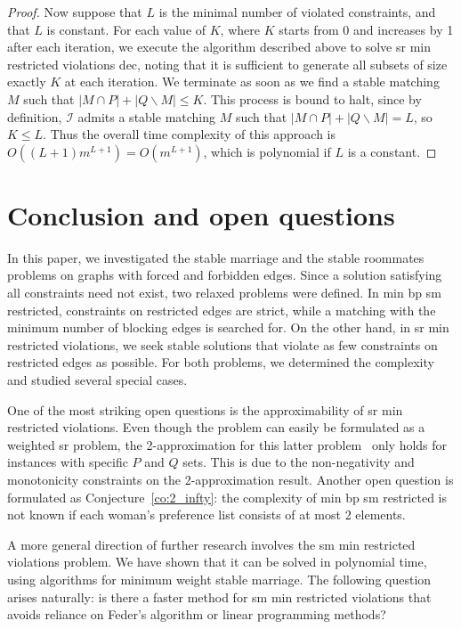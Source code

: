 \documentclass[preprint,12pt]{elsarticle}
\begin{document}
\begin{proof}
Now suppose that $L$ is the minimal number of violated constraints, and that $L$ is constant. For each value of $K$, where $K$ starts from 0 and increases by 1 after each iteration, we execute the algorithm described above to solve {\sc sr min restricted violations dec}, noting that it is sufficient to generate all subsets of size exactly $K$ at each iteration.  We terminate as soon as we find a stable matching $M$ such that 
 $|M\cap P|+|Q\backslash M|\leq K$.  This process is bound to halt, since by definition, $\mathcal I$ admits a stable matching $M$ such that $|M\cap P|+|Q\backslash M|=L$, so $K\leq L$. Thus the overall time complexity of this approach is $O((L+1)m^{L+1})=O(m^{L+1})$, which is polynomial if $L$ is a constant.
\end{proof}

\section{Conclusion and open questions}
\label{sec:conc}
    In this paper, we investigated the stable marriage and the stable roommates problems on graphs with forced and forbidden edges. Since a solution satisfying all constraints need not exist, two relaxed problems were defined. In {\sc min bp sm restricted}, constraints on restricted edges are strict, while a matching with the  minimum number of blocking edges is searched for. On the other hand, in {\sc sr min restricted violations}, we seek stable solutions that violate as few constraints on restricted edges as possible. For both problems, we determined the complexity and studied several special cases.
    
One of the most striking open questions is the approximability of {\sc sr min restricted violations}. Even though the problem can easily be formulated as a weighted {\sc sr} problem, the 2-approximation for this latter problem~\cite{TS97,TS98} only holds for instances with specific $P$ and $Q$ sets. This is due to the non-negativity and monotonicity constraints on the 2-approximation result. Another open question is formulated as Conjecture~\ref{co:2_infty}: the complexity of {\sc min bp sm restricted} is not known if each woman's preference list consists of at most 2 elements.

A more general direction of further research involves the {\sc sm min restricted violations} problem. We have shown that it can be solved in polynomial time, using algorithms for minimum weight stable marriage. The following question arises naturally: is there a faster method for {\sc sm min restricted violations} that avoids reliance on Feder's algorithm or linear programming methods?
\end{document}
